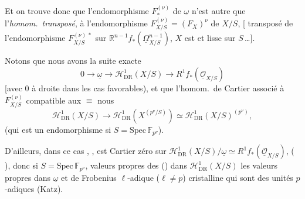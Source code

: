 \documentclass[11pt,a4paper]{article}
\begin{document}

Et on trouve donc que l'endomorphisme $F_{*}^{(\nu)}$ \struck{\ill{}} de $\underline{\omega}$  n'est autre que l'\emph{homom.\ transposé},  à l'endomorphisme $F^{(\nu)}_{X/S} = (F_{X})^{\nu}$ de $X/S$, [  transposé de l'endomorphisme $F^{(\nu)\,*}_{X/S}$ sur $\mathbb{R}^{n-1}f_{*}(\underline{\Omega}^{n-1}_{X/S})$,  $X$ est  et lisse sur $S$\,…].

 Notons que nous avons la suite exacte
\[
0 \to \underline{\omega} \to \mathcal{H}^{1}_{\mathrm{DR}}(X/S) \to R^{1}f_{*}(\underline{\mathcal{O}}_{X/S})
\]
[avec  $0$ à droite dans les cas favorables), et que l'homom.\ de Cartier associé à $F^{(\nu)}_{X/S}$  compatible aux  $\equiv$ nous  \ill{}
\[
\mathcal{H}^{1}_{\mathrm{DR}}(X/S) \to \mathcal{H}^{1}_{\mathrm{DR}}(X^{(p^{\nu}/S)}) \simeq \mathcal{H}^{1}_{\mathrm{DR}}(X/S)^{(p^{\nu})},
\]
(qui est un endomorphisme si $S = \mathrm{Spec}\,\mathbb{F}_{p^{\nu}}$). 

D'ailleurs, dans ce cas , \struck{\ill{}}, est   Cartier  zéro sur $\mathcal{H}^{1}_{\mathrm{DR}}(X/S)/\underline{\omega} \simeq R^{1}f_{*}(\underline{\mathcal{O}}_{X/S})$,  (  ), donc si $S = \mathrm{Spec}\,\mathbb{F}_{p^{\nu}}$,    valeurs propres des  (\ill{})  dans $\mathcal{H}^{1}_{\mathrm{DR}}(X/S)$    les valeurs propres dans $\underline{\omega}$ et    de Frobenius $\ell$-adique ($\ell \neq p$)   cristalline qui sont des unités $p$-adiques (Katz).
\end{document}
